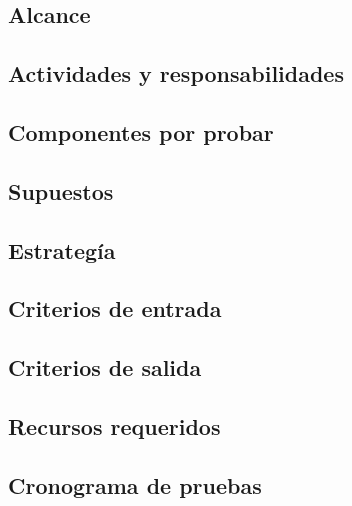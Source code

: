\Blindtext[1]

\subsection{Alcance}
\label{subsection:plan-pruebas:alcance}

\Blindtext[1]

\subsection{Actividades y responsabilidades}
\label{subsection:plan-pruebas:responsabilidades}

\Blindtext[1]

\subsection{Componentes por probar}
\label{subsection:plan-pruebas:componentes}

\Blindtext[1]

\subsection{Supuestos}
\label{subsection:plan-pruebas:supuestos}

\Blindtext[1]

\subsection{Estrategía}
\label{subsection:plan-pruebas:estrategia}

\Blindtext[1]

\subsection{Criterios de entrada}
\label{subsection:plan-pruebas:criterios-entrada}

\Blindtext[1]

\subsection{Criterios de salida}
\label{subsection:plan-pruebas:criterios-salida}

\Blindtext[1]

\subsection{Recursos requeridos}
\label{subsection:plan-pruebas:recursos}

\Blindtext[1]

\subsection{Cronograma de pruebas}
\label{subsection:plan-section:cronograma}

\Blindtext[1]

